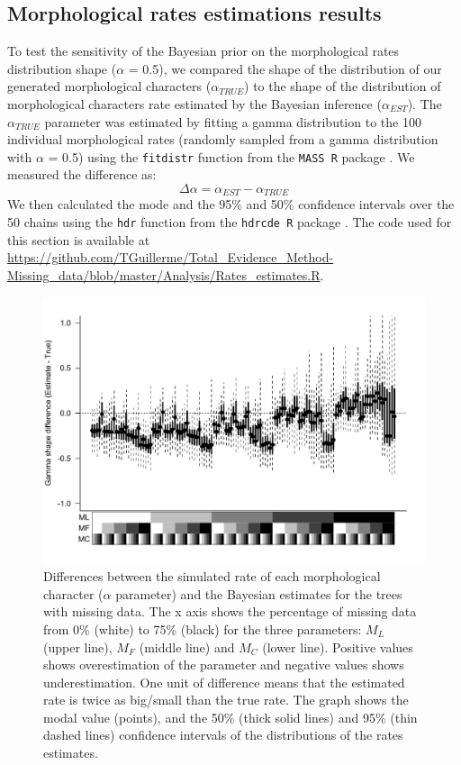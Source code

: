 \documentclass[12pt,letterpaper]{article}
\begin{document}
\subsection{Morphological rates estimations results}
To test the sensitivity of the Bayesian prior on the morphological rates distribution shape ($\alpha$ = 0.5), we compared the shape of the distribution of our generated morphological characters ($\alpha_{TRUE}$) to the shape of the distribution of morphological characters rate estimated by the Bayesian inference ($\alpha_{EST}$).
The $\alpha_{TRUE}$ parameter was estimated by fitting a gamma distribution to the 100 individual morphological rates (randomly sampled from a gamma distribution with $\alpha$ = 0.5) using the \texttt{fitdistr} function from the \texttt{MASS R} package \citep{MASS}.
We measured the difference as:
\begin{equation}
\Delta\alpha=\alpha_{EST} - \alpha_{TRUE}
\end{equation}
We then calculated the mode and the 95\% and 50\% confidence intervals over the 50 chains using the \texttt{hdr} function from the \texttt{hdrcde R} package \citep{hdrcde}.
The code used for this section is available at \url{https://github.com/TGuillerme/Total_Evidence_Method-Missing_data/blob/master/Analysis/Rates_estimates.R}.

\begin{figure}
\centering
\includegraphics[width=\textwidth,keepaspectratio]{SupplementaryFigures/Rates_estimates.pdf}
\caption{Differences between the simulated rate of each morphological character ($\alpha$ parameter) and the Bayesian estimates for the trees with missing data. The x axis shows the percentage of missing data from 0\% (white) to 75\% (black) for the three parameters: $M_{L}$ (upper line), $M_{F}$ (middle line) and $M_{C}$ (lower line). Positive values shows overestimation of the parameter and negative values shows underestimation. One unit of difference means that the estimated rate is twice as big/small than the true rate. The graph shows the modal value (points), and the 50\% (thick solid lines) and 95\% (thin dashed lines) confidence intervals of the distributions of the rates estimates.}
\label{Fig_AppendixCharacters}
\end{figure}
\end{document}
